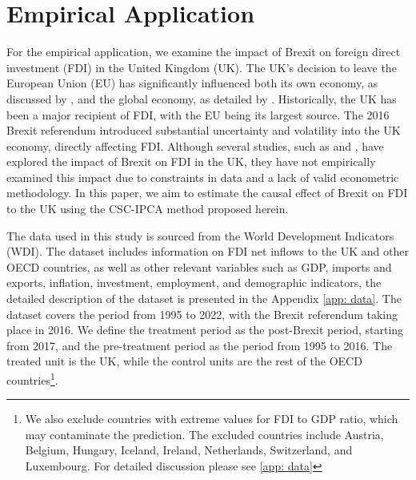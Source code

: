 \documentclass[12pt]{article}
\begin{document}
\section{Empirical Application}
\label{sec: application}
For the empirical application, we examine the impact of Brexit on foreign direct investment (FDI) in the United Kingdom (UK). The UK's decision to leave the European Union (EU) has significantly influenced both its own economy, as discussed by \cite{arnorsson2018causes}, and the global economy, as detailed by \cite{colantone2018global}. Historically, the UK has been a major recipient of FDI, with the EU being its largest source. The 2016 Brexit referendum introduced substantial uncertainty and volatility into the UK economy, directly affecting FDI. Although several studies, such as \cite{dhingra2016impact} and \cite{welfens2018brexit}, have explored the impact of Brexit on FDI in the UK, they have not empirically examined this impact due to constraints in data and a lack of valid econometric methodology. In this paper, we aim to estimate the causal effect of Brexit on FDI to the UK using the CSC-IPCA method proposed herein.

The data used in this study is sourced from the World Development Indicators (WDI). The dataset includes information on FDI net inflows to the UK and other OECD countries, as well as other relevant variables such as GDP, imports and exports, inflation, investment, employment, and demographic indicators, the detailed description of the dataset is presented in the Appendix \ref{app: data}. The dataset covers the period from 1995 to 2022, with the Brexit referendum taking place in 2016. We define the treatment period as the post-Brexit period, starting from 2017, and the pre-treatment period as the period from 1995 to 2016. The treated unit is the UK, while the control units are the rest of the OECD countries\footnote{We also exclude countries with extreme values for FDI to GDP ratio, which may contaminate the prediction. The excluded countries include  Austria, Belgium, Hungary, Iceland, Ireland, Netherlands, Switzerland, and  Luxembourg. For detailed discussion please see \ref{app: data}}.
\end{document}
